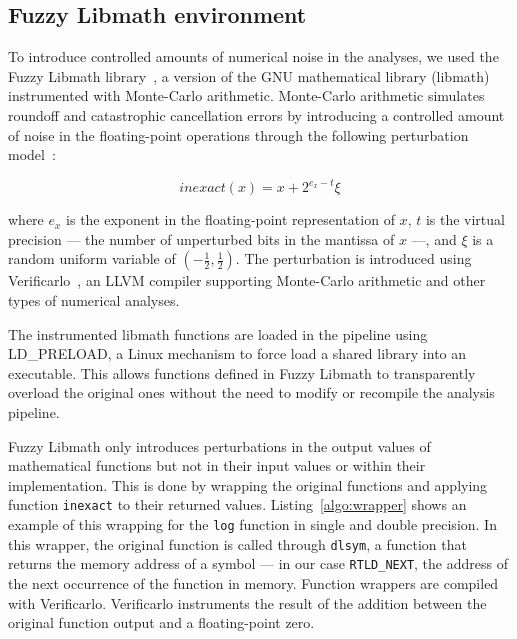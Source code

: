 \documentclass[conference]{IEEEtran}
\begin{document}
\subsection{Fuzzy Libmath environment}

To introduce controlled amounts of numerical noise in the analyses, we used
the Fuzzy Libmath library~\cite{salari2021accurate}, a version of the GNU
mathematical library (libmath) instrumented with Monte-Carlo arithmetic.
Monte-Carlo arithmetic simulates roundoff and catastrophic cancellation
errors by introducing a controlled amount of noise in the floating-point
operations through the following perturbation model~\cite{Parker1997-qq}:

\begin{equation} \label{eq:mca_inexact}
  inexact(x) = x + 2^{e_x-t}\xi
\end{equation}

where $e_x$ is the exponent in the floating-point representation of $x$,
$t$ is the virtual precision --- the number of unperturbed bits in the
mantissa of $x$ ---, and $\xi$ is a random uniform variable of
$(-\frac{1}{2}, \frac{1}{2})$. The perturbation is introduced using 
Verificarlo~\cite{denis2015verificarlo}, an LLVM compiler supporting Monte-Carlo 
arithmetic and other types of numerical analyses.

The instrumented libmath functions are loaded in the pipeline using
LD\_PRELOAD, a Linux mechanism to force load a shared library into an
executable. This allows functions defined in Fuzzy Libmath to transparently
overload the original ones without the need to modify or recompile the
analysis pipeline.

Fuzzy Libmath only introduces perturbations in the output values of
mathematical functions but not in their input values or within their
implementation. This is done by wrapping the original functions and
applying function \texttt{inexact} to their returned values.
Listing~\ref{algo:wrapper} shows an example of this wrapping for the
\texttt{log} function in single and double precision. In this wrapper, the
original function is called through \texttt{dlsym}, a function that returns
the memory address of a symbol --- in our case \texttt{RTLD\_NEXT}, the
address of the next occurrence of the function in memory. Function wrappers
are compiled with Verificarlo. Verificarlo instruments the result of the
addition between the original function output and a floating-point zero.


\end{document}
